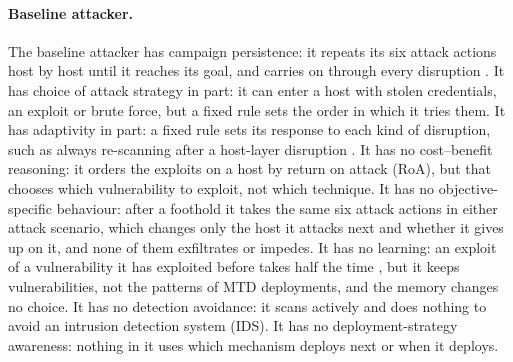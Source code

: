 \documentclass{cshonours}
\begin{document}
\paragraph{Baseline attacker.} The baseline attacker has campaign persistence: it
repeats its six attack actions host by host until it reaches its goal, and
carries on through every disruption \citep{brown2023}. It has choice of attack strategy in part: it can enter a host with stolen credentials, an exploit or brute force, but a fixed rule sets the order in which it tries them. It has adaptivity in part: a fixed
rule sets its response to each kind of disruption, such as always
re-scanning after a host-layer disruption \citep{brown2023}. It has no cost--benefit reasoning: it orders the exploits on a host by
return on attack (RoA), but that chooses which vulnerability to exploit, not which technique. It has no objective-specific behaviour: after a foothold it takes the same
six attack actions in either attack scenario, which changes only the host it
attacks next and whether it gives up on it, and none of them exfiltrates or impedes. It has no learning: an
exploit of a vulnerability it has exploited before takes half the time
\citep{zhang2023}, but it keeps vulnerabilities, not the patterns of MTD
deployments, and the memory changes no choice. It has no detection avoidance: it scans actively and does nothing to avoid an intrusion detection system (IDS). It has no deployment-strategy awareness: nothing in it uses which mechanism deploys next or when
it deploys.
\end{document}
